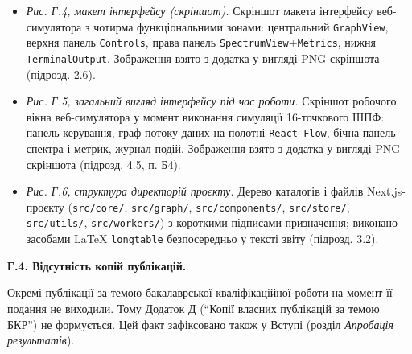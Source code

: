 \documentclass[
]{article}
\newcommand{\passthrough}[1]{#1}
\begin{document}
\begin{itemize}
  у.о.; критичний шлях \(T_{kr} = 3400\) у.о.; коефіцієнт
  \(K_{p} \approx 1,88\) (підрозд. 4.3, Додаток В табл. В.3).
\item
  \emph{Рис. Г.4, макет інтерфейсу (скріншот).} Скріншот макета
  інтерфейсу веб-симулятора з чотирма функціональними зонами:
  центральний \passthrough{\lstinline!GraphView!}, верхня панель
  \passthrough{\lstinline!Controls!}, права панель
  \passthrough{\lstinline!SpectrumView!}+\passthrough{\lstinline!Metrics!},
  нижня \passthrough{\lstinline!TerminalOutput!}. Зображення взято з
  додатка у вигляді PNG-скріншота (підрозд. 2.6).
\item
  \emph{Рис. Г.5, загальний вигляд інтерфейсу під час роботи.} Скріншот
  робочого вікна веб-симулятора у момент виконання симуляції
  16-точкового ШПФ: панель керування, граф потоку даних на полотні
  \passthrough{\lstinline!React!}\passthrough{\lstinline! !}\passthrough{\lstinline!Flow!},
  бічна панель спектра і метрик, журнал подій. Зображення взято з
  додатка у вигляді PNG-скріншота (підрозд. 4.5, п. Б4).
\item
  \emph{Рис. Г.6, структура директорій проєкту.} Дерево каталогів і
  файлів Next.js-проєкту (\passthrough{\lstinline!src/core/!},
  \passthrough{\lstinline!src/graph/!},
  \passthrough{\lstinline!src/components/!},
  \passthrough{\lstinline!src/store/!},
  \passthrough{\lstinline!src/utils/!},
  \passthrough{\lstinline!src/workers/!}) з короткими підписами
  призначення; виконано засобами LaTeX
  \passthrough{\lstinline!longtable!} безпосередньо у тексті звіту
  (підрозд. 3.2).
\end{itemize}

\textbf{Г.4. Відсутність копій публікацій.}

Окремі публікації за темою бакалаврської кваліфікаційної роботи на
момент її подання не виходили. Тому Додаток Д (``Копії власних
публікацій за темою БКР'') не формується. Цей факт зафіксовано також у
Вступі (розділ \emph{Апробація результатів}).
\end{document}
